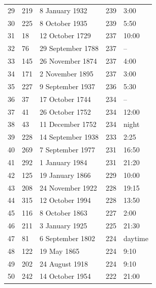 \documentclass{article}
\begin{document}
\begin{tabular}{lllll}
29 & 219 & 8 January 1932 & 239 & 3:00 \\
30 & 225 & 8 October 1935 & 239 & 5:50 \\
31 & 18 & 12 October 1729 & 237 & 10:00 \\
32 & 76 & 29 September 1788 & 237 & – \\
33 & 145 & 26 November 1874 & 237 & 4:00 \\
34 & 171 & 2 November 1895 & 237 & 3:00 \\
35 & 227 & 9 September 1937 & 236 & 5:30 \\
36 & 37 & 17 October 1744 & 234 & – \\
37 & 41 & 26 October 1752 & 234 & 12:00 \\
38 & 43 & 11 December 1752 & 234 & night \\
39 & 228 & 14 September 1938 & 233 & 2:25 \\
40 & 269 & 7 September 1977 & 231 & 16:50 \\
41 & 292 & 1 January 1984 & 231 & 21:20 \\
42 & 125 & 19 January 1866 & 229 & 10:00 \\
43 & 208 & 24 November 1922 & 228 & 19:15 \\
44 & 315 & 12 October 1994 & 228 & 13:50 \\
45 & 116 & 8 October 1863 & 227 & 2:00 \\
46 & 211 & 3 January 1925 & 225 & 21:30 \\
47 & 81 & 6 September 1802 & 224 & daytime \\
48 & 122 & 19 May 1865 & 224 & 9:10 \\
49 & 202 & 24 August 1918 & 224 & 9:10 \\
50 & 242 & 14 October 1954 & 222 & 21:00 \\
\bottomrule
\end{tabular}
\end{document}
